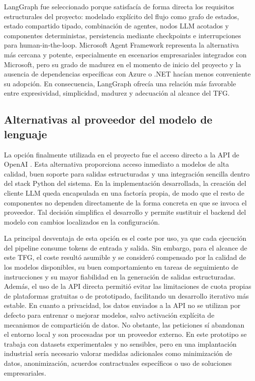 \documentclass[12pt,a4paper]{article}
\theoremstyle{plain}
\begin{document}
LangGraph fue seleccionado porque satisfacía de forma directa los requisitos estructurales del proyecto: modelado explícito del flujo como grafo de estados, estado compartido tipado, combinación de agentes, nodos LLM acotados y componentes deterministas, persistencia mediante checkpoints e interrupciones para human-in-the-loop. Microsoft Agent Framework representa la alternativa más cercana y potente, especialmente en escenarios empresariales integrados con Microsoft, pero su grado de madurez en el momento de inicio del proyecto y la ausencia de dependencias específicas con Azure o .NET hacían menos conveniente su adopción. En consecuencia, LangGraph ofrecía una relación más favorable entre expresividad, simplicidad, madurez y adecuación al alcance del TFG.


\subsection{Alternativas al proveedor del modelo de lenguaje}
\label{sec:alt-proveedor}

La opción finalmente utilizada en el proyecto fue el acceso directo a la API de OpenAI \cite{openai_data_controls, openai_api_pricing}. Esta alternativa proporciona acceso inmediato a modelos de alta calidad, buen soporte para salidas estructuradas y una integración sencilla dentro del stack Python del sistema. En la implementación desarrollada, la creación del cliente LLM queda encapsulada en una factoría propia, de modo que el resto de componentes no dependen directamente de la forma concreta en que se invoca el proveedor. Tal decisión simplifica el desarrollo y permite sustituir el backend del modelo con cambios localizados en la configuración.

La principal desventaja de esta opción es el coste por uso, ya que cada ejecución del pipeline consume tokens de entrada y salida. Sin embargo, para el alcance de este TFG, el coste resultó asumible y se consideró compensado por la calidad de los modelos disponibles, su buen comportamiento en tareas de seguimiento de instrucciones y su mayor fiabilidad en la generación de salidas estructuradas. Además, el uso de la API directa permitió evitar las limitaciones de cuota propias de plataformas gratuitas o de prototipado, facilitando un desarrollo iterativo más estable. En cuanto a privacidad, los datos enviados a la API no se utilizan por defecto para entrenar o mejorar modelos, salvo activación explícita de mecanismos de compartición de datos. No obstante, las peticiones sí abandonan el entorno local y son procesadas por un proveedor externo. En este prototipo se trabaja con datasets experimentales y no sensibles, pero en una implantación industrial sería necesario valorar medidas adicionales como minimización de datos, anonimización, acuerdos contractuales específicos o uso de soluciones empresariales.
\end{document}
